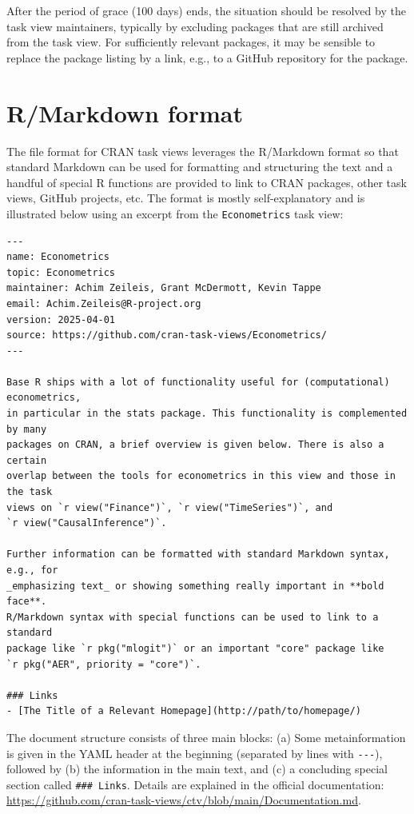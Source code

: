 After the period of grace (100 days) ends, the situation should be resolved by
the task view maintainers, typically by excluding packages that are still archived from the
task view. For sufficiently relevant packages, it may be sensible to replace the
package listing by a link, e.g., to a GitHub repository for the package.

\section{R/Markdown format}\label{sec:format}

The file format for CRAN task views leverages the R/Markdown format \citep{rmarkdown}
so that standard Markdown can be used for formatting and structuring the
text and a handful of special R functions are provided to link to CRAN
packages, other task views, GitHub projects, etc.
The format is mostly self-explanatory and is illustrated below using an
excerpt from the \texttt{Econometrics} task view:

\begin{verbatim}
---
name: Econometrics
topic: Econometrics
maintainer: Achim Zeileis, Grant McDermott, Kevin Tappe
email: Achim.Zeileis@R-project.org
version: 2025-04-01
source: https://github.com/cran-task-views/Econometrics/
---

Base R ships with a lot of functionality useful for (computational) econometrics,
in particular in the stats package. This functionality is complemented by many
packages on CRAN, a brief overview is given below. There is also a certain
overlap between the tools for econometrics in this view and those in the task
views on `r view("Finance")`, `r view("TimeSeries")`, and
`r view("CausalInference")`.

Further information can be formatted with standard Markdown syntax, e.g., for
_emphasizing text_ or showing something really important in **bold face**.
R/Markdown syntax with special functions can be used to link to a standard
package like `r pkg("mlogit")` or an important "core" package like
`r pkg("AER", priority = "core")`.

### Links
- [The Title of a Relevant Homepage](http://path/to/homepage/)
\end{verbatim}

The document structure consists of three main blocks: (a) Some metainformation
is given in the YAML header at the beginning (separated by lines with \texttt{-\/-\/-}),
followed by (b) the information in the main text, and (c) a concluding special
section called \texttt{\#\#\#\ Links}. Details are explained in the official documentation:
\url{https://github.com/cran-task-views/ctv/blob/main/Documentation.md}.

